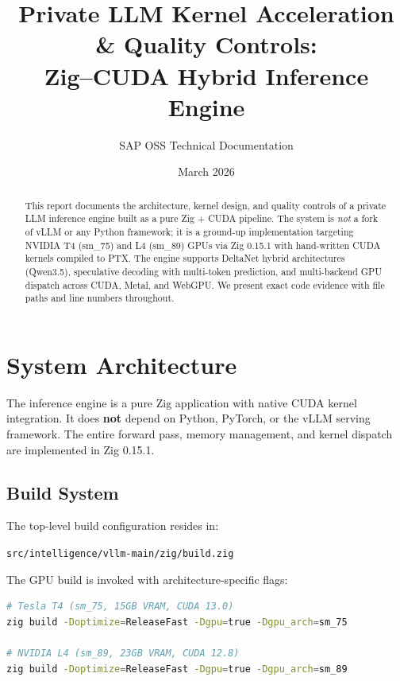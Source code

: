 \documentclass[11pt]{article}
\title{Private LLM Kernel Acceleration \& Quality Controls:\\Zig--CUDA Hybrid Inference Engine}
\author{SAP OSS Technical Documentation}
\date{March 2026}
\begin{document}
\maketitle

\begin{abstract}
This report documents the architecture, kernel design, and quality controls of a
private LLM inference engine built as a pure Zig + CUDA pipeline. The system is
\emph{not} a fork of vLLM or any Python framework; it is a ground-up
implementation targeting NVIDIA T4 (sm\_75) and L4 (sm\_89) GPUs via Zig 0.15.1
with hand-written CUDA kernels compiled to PTX. The engine supports DeltaNet
hybrid architectures (Qwen3.5), speculative decoding with multi-token prediction,
and multi-backend GPU dispatch across CUDA, Metal, and WebGPU. We present
exact code evidence with file paths and line numbers throughout.
\end{abstract}

\tableofcontents
\newpage

\section{System Architecture}
\label{sec:architecture}

The inference engine is a pure Zig application with native CUDA kernel
integration. It does \textbf{not} depend on Python, PyTorch, or the vLLM
serving framework. The entire forward pass, memory management, and kernel
dispatch are implemented in Zig 0.15.1.

\subsection{Build System}

The top-level build configuration resides in:
\begin{center}
\texttt{src/intelligence/vllm-main/zig/build.zig}
\end{center}

The GPU build is invoked with architecture-specific flags:

\begin{lstlisting}[language=bash,caption={Build commands for T4 and L4 targets}]
# Tesla T4 (sm_75, 15GB VRAM, CUDA 13.0)
zig build -Doptimize=ReleaseFast -Dgpu=true -Dgpu_arch=sm_75

# NVIDIA L4 (sm_89, 23GB VRAM, CUDA 12.8)
zig build -Doptimize=ReleaseFast -Dgpu=true -Dgpu_arch=sm_89
\end{lstlisting}
\end{document}
